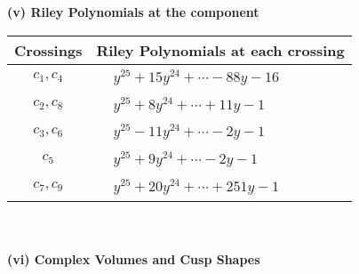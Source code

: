 \documentclass[1p]{elsarticle_modified}
\theoremstyle{definition}
\begin{document}
\newpage\renewcommand{\arraystretch}{1}
\flushleft \textbf{(v) Riley Polynomials at the component}\newline \\
\begin{tabular}{m{50pt}|m{274pt}}
Crossings & \hspace{64pt}Riley Polynomials at each crossing \\
\hline $$\begin{aligned}c_{1},c_{4}\end{aligned}$$&$\begin{aligned}
&y^{25}+15 y^{24}+\cdots-88 y-16
\end{aligned}$\\
\hline $$\begin{aligned}c_{2},c_{8}\end{aligned}$$&$\begin{aligned}
&y^{25}+8 y^{24}+\cdots+11 y-1
\end{aligned}$\\
\hline $$\begin{aligned}c_{3},c_{6}\end{aligned}$$&$\begin{aligned}
&y^{25}-11 y^{24}+\cdots-2 y-1
\end{aligned}$\\
\hline $$\begin{aligned}c_{5}\end{aligned}$$&$\begin{aligned}
&y^{25}+9 y^{24}+\cdots-2 y-1
\end{aligned}$\\
\hline $$\begin{aligned}c_{7},c_{9}\end{aligned}$$&$\begin{aligned}
&y^{25}+20 y^{24}+\cdots+251 y-1
\end{aligned}$\\
\hline
\end{tabular}\\~\\
\newpage\flushleft \textbf{(vi) Complex Volumes and Cusp Shapes}
\end{document}
